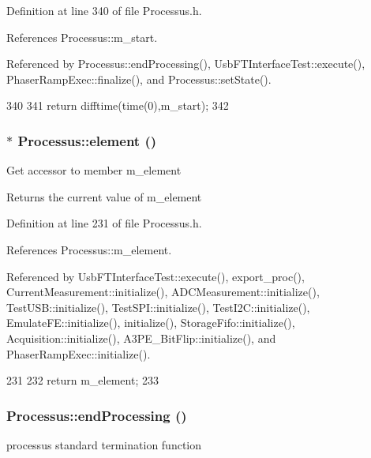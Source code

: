 Definition at line 340 of file Processus.h.

References Processus::m\_\-start.

Referenced by Processus::endProcessing(), UsbFTInterfaceTest::execute(), PhaserRampExec::finalize(), and Processus::setState().


\begin{DoxyCode}
340                        {
341     return difftime(time(0),m_start);
342   }
\end{DoxyCode}
\hypertarget{classProcessus_a6fe155527431a7190b7d44d600b9608d}{
\subsubsection[{element}]{$\ast$ Processus::element ()}}
\label{classProcessus_a6fe155527431a7190b7d44d600b9608d}
Get accessor to member m\_\-element \begin{DoxyReturn}{Returns}
the current value of m\_\-element 
\end{DoxyReturn}


Definition at line 231 of file Processus.h.

References Processus::m\_\-element.

Referenced by UsbFTInterfaceTest::execute(), export\_\-proc(), CurrentMeasurement::initialize(), ADCMeasurement::initialize(), TestUSB::initialize(), TestSPI::initialize(), TestI2C::initialize(), EmulateFE::initialize(), initialize(), StorageFifo::initialize(), Acquisition::initialize(), A3PE\_\-BitFlip::initialize(), and PhaserRampExec::initialize().


\begin{DoxyCode}
231                       {
232     return m_element;
233   }
\end{DoxyCode}
\hypertarget{classProcessus_a5e4da662989d356b89d490b89c7afbfd}{
\subsubsection[{endProcessing}]{ Processus::endProcessing ()}}
\label{classProcessus_a5e4da662989d356b89d490b89c7afbfd}
processus standard termination function 

